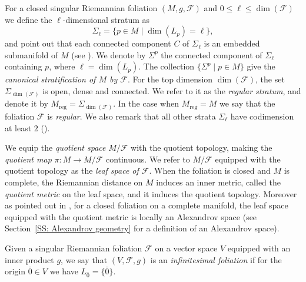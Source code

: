 \documentclass[12pt,a4paper,reqno]{amsart}
\theoremstyle{definition}
\numberwithin{equation}{section}
\newcommand{\fol}{\mathcal{F}}
\newcommand{\reg}{\mathrm{reg}}
\begin{document}
For a closed singular Riemannian foliation $(M,g,\fol)$ and $0\leq \ell\leq \dim(\fol)$ we define the $\ell$-dimensional stratum as
\[
\Sigma_\ell = \{p\in M\mid \dim(L_p) = \ell\},
\] 
and point out that each connected component $C$ of $\Sigma_\ell$ is an embedded submanifold of $M$ (see \cite{Radeschi2012}). We denote  by $\Sigma^p$ the connected component of $\Sigma_\ell$ containing $p$, where $\ell= \dim(L_p)$. The collection $\{\Sigma^p\mid p\in M\}$ give the \emph{canonical stratification of $M$ by $\fol$}. For the top dimension $\dim(\fol)$, the set $\Sigma_{\dim(\fol)}$ is open, dense and connected. We refer to it as the \emph{regular stratum}, and denote it by $M_\reg = \Sigma_{\dim(\fol)}$. In the case when $M_\reg = M$ we say that the foliation $\fol$ is \emph{regular}. We also remark that all other strata $\Sigma_\ell$ have codimension at least $2$ (\cite[Section 2.3]{GalazGarciaRadeschi2015}).

We equip the \emph{quotient space} $M/\fol$ with the quotient topology, making the \emph{quotient map} $\pi\colon  M\to M/\fol$ continuous. We refer to $M/\fol$ equipped with the quotient topology as the \emph{leaf space of $\fol$}. When the foliation is closed and $M$ is complete, the Riemannian distance on $M$ induces an inner metric, called the \emph{quotient metric} on the leaf space, and it induces the quotient topology. Moreover as pointed out in \cite[p. 2943]{GroveMorenoPetersen2019}, for a closed foliation on a complete manifold, the leaf space equipped with the quotient metric is locally an Alexandrov space (see Section~\ref{SS: Alexandrov geometry} for a definition of an Alexandrov space).

Given a singular Riemannian foliation $\fol$ on a vector space $V$ equipped with an inner product $g$, we say that $(V,\fol,g)$ is an \emph{infinitesimal foliation} if for the origin $\bar{0}\in V$ we have $L_{\bar{0}}=\{\bar{0}\}$. 
\end{document}
